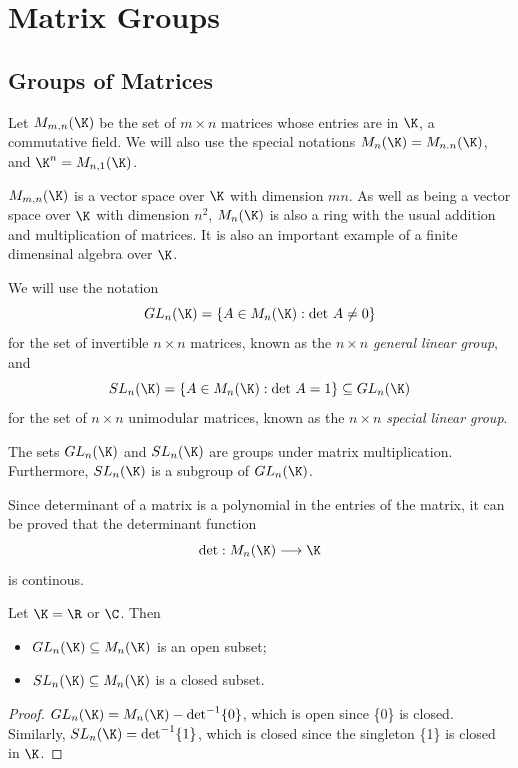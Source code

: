 \chapter{Matrix Groups}

\section{Groups of Matrices}

Let \(M_{m,n}(\K)\) be the set of \(m\times n\) matrices whose entries are in \(\K\), a commutative field.
We will also use the special notations \(M_n(\K)=M_{n.n}(\K)\), and \(\K^n=M_{n,1}(\K)\).

\(M_{m,n}(\K)\) is a vector space over \(\K\) with dimension \(mn\). As well as being a vector space over
\(\K\) with dimension \(n^2\), \(M_n(\K)\) is also a ring with the usual addition and multiplication of
matrices. It is also an important example of a finite dimensinal algebra over \(\K\).

We will use the notation
\[ GL_n(\K)=\{A\in M_n(\K):\text{det }A\ne0\} \]
for the set of invertible \(n\times n\) matrices, known as the \(n\times n\) {\it general linear group}, and 
\[ SL_n(\K)=\{A\in M_n(\K):\text{det }A=1\}\subseteq GL_n(\K) \]
for the set of \(n\times n\) unimodular matrices, known as the \(n\times n\) {\it special linear group}.

\begin{theorem}
  The sets \(GL_n(\K)\) and \(SL_n(\K)\) are groups under matrix multiplication. Furthermore,
  \(SL_n(\K)\) is a subgroup of \(GL_n(\K)\).
\end{theorem}

Since determinant of a matrix is a polynomial in the entries of the matrix, it can
be proved that the determinant function
\[\text{det}:M_n(\K)\longrightarrow\K\]
is continous.

\begin{proposition}
  Let \(\K=\R\) or \(\C\). Then
  \begin{itemize}
    \item[\((i)\)] \(GL_n(\K)\subseteq M_n(\K)\) is an open subset;
    \item[\((ii)\)] \(SL_n(\K)\subseteq M_n(\K)\) is a closed subset.
  \end{itemize}
\end{proposition}

\begin{proof}
  \(GL_n(\K)=M_n(\K)-\text{det}^{-1}\{0\}\), which is open since \{0\} is closed. Similarly,
  \(SL_n(\K)=\text{det}^{-1}\{1\}\), which is closed since the singleton \{1\} is closed in \(\K\).
\end{proof}


